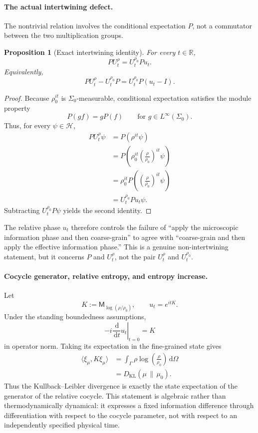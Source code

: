 \documentclass[a4paper,11pt]{article}
\newtheorem{proposition}[theorem]{Proposition}
\theoremstyle{definition}
\newcommand{\dd}{\,\mathrm{d}}
\newcommand{\cH}{\mathcal{H}}
\newcommand{\KLL}{D_{\mathrm{KL}}}
\newcommand{\Mop}{\mathsf{M}}
\begin{document}
\paragraph{The actual intertwining defect.}
The nontrivial relation involves the conditional expectation $P$, not a commutator between the two multiplication groups.

\begin{proposition}[Exact intertwining identity]
For every $t\in\mathbb{R}$,
\[
  PU_t^\rho=U_t^{\rho_0}Pu_t.
\]
Equivalently,
\[
  PU_t^\rho-U_t^{\rho_0}P
  =U_t^{\rho_0}P(u_t-I).
\]
\end{proposition}

\begin{proof}
Because $\rho_0^{it}$ is $\Sigma_0$-measurable, conditional expectation satisfies the module property
\[
  P(gf)=gP(f)
  \qquad
  \text{for }g\in L^\infty(\Sigma_0).
\]
Thus, for every $\psi\in\cH$,
\begin{align*}
  PU_t^\rho\psi
  &=P\!\left(\rho^{it}\psi\right)\\
  &=P\!\left(\rho_0^{it}
       \left(\frac{\rho}{\rho_0}\right)^{it}\psi\right)\\
  &=\rho_0^{it}
       P\!\left(\left(\frac{\rho}{\rho_0}\right)^{it}\psi\right)\\
  &=U_t^{\rho_0}Pu_t\psi.
\end{align*}
Subtracting $U_t^{\rho_0}P\psi$ yields the second identity.
\end{proof}

The relative phase $u_t$ therefore controls the failure of ``apply the microscopic information phase and then coarse-grain'' to agree with ``coarse-grain and then apply the effective information phase.''  This is a genuine non-intertwining statement, but it concerns $P$ and $U_t^\rho$, not the pair $U_t^\rho$ and $U_t^{\rho_0}$.

\paragraph{Cocycle generator, relative entropy, and entropy increase.}
Let
\[
  K:=\Mop_{\log(\rho/\rho_0)},
  \qquad
  u_t=e^{itK}.
\]
Under the standing boundedness assumptions,
\[
  -i\left.\frac{\dd}{\dd t}u_t\right|_{t=0}=K
\]
in operator norm.  Taking its expectation in the fine-grained state gives
\begin{align*}
  \langle\xi_\mu,K\xi_\mu\rangle
  &=\int_\Gamma \rho
       \log\left(\frac{\rho}{\rho_0}\right)\dd\Omega\\
  &=\KLL(\mu\,\|\,\mu_0).
\end{align*}
Thus the Kullback--Leibler divergence is exactly the state expectation of the generator of the relative cocycle.  This statement is algebraic rather than thermodynamically dynamical: it expresses a fixed information difference through differentiation with respect to the cocycle parameter, not with respect to an independently specified physical time.
\end{document}
